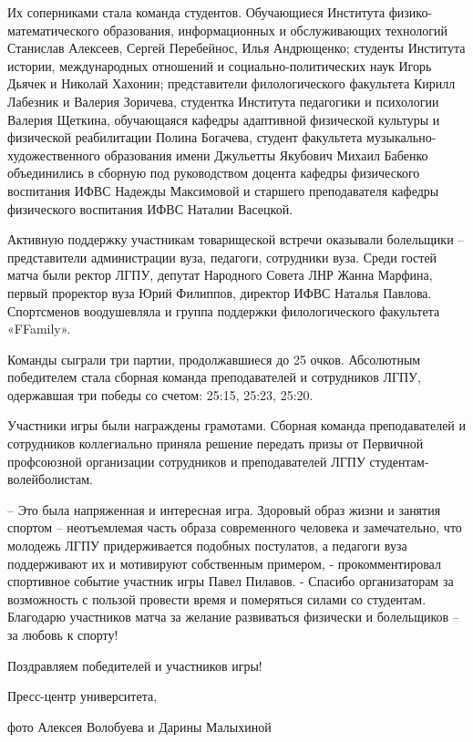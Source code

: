 
Их соперниками стала команда студентов. Обучающиеся Института
физико-математического образования, информационных и обслуживающих технологий
Станислав Алексеев, Сергей Перебейнос, Илья Андрющенко; студенты Института
истории, международных отношений и социально-политических наук Игорь Дьячек и
Николай Хахонин; представители филологического факультета Кирилл Лабезник и
Валерия Зоричева, студентка Института педагогики и психологии Валерия Щеткина,
обучающаяся кафедры адаптивной физической культуры и физической реабилитации
Полина Богачева, студент факультета музыкально-художественного образования
имени Джульетты Якубович Михаил Бабенко объединились в сборную под руководством
доцента кафедры физического воспитания ИФВС Надежды Максимовой и старшего
преподавателя кафедры физического воспитания ИФВС Наталии Васецкой.

Активную поддержку участникам товарищеской встречи оказывали болельщики –
представители администрации вуза, педагоги, сотрудники вуза. Среди гостей матча
были ректор ЛГПУ, депутат Народного Совета ЛНР Жанна Марфина, первый проректор
вуза Юрий Филиппов, директор ИФВС Наталья Павлова. Спортсменов воодушевляла и
группа поддержки филологического факультета «FFamily».

Команды сыграли три партии, продолжавшиеся до 25 очков. Абсолютным победителем
стала сборная команда преподавателей и сотрудников ЛГПУ, одержавшая три победы
со счетом: 25:15, 25:23, 25:20.

Участники игры были награждены грамотами. Сборная команда преподавателей и
сотрудников коллегиально приняла решение передать призы от Первичной
профсоюзной организации сотрудников и преподавателей ЛГПУ
студентам-волейболистам.

\begin{zznagolos}
\normalsize
– Это была напряженная и интересная игра. Здоровый образ жизни и занятия
спортом – неотъемлемая часть образа современного человека и замечательно, что
молодежь ЛГПУ придерживается подобных постулатов, а педагоги вуза поддерживают
их и мотивируют собственным примером, - прокомментировал спортивное событие
участник игры Павел Пилавов. - Спасибо организаторам за возможность с пользой
провести время  и померяться силами со студентам. Благодарю участников матча за
желание развиваться физически и болельщиков – за любовь к спорту!
\end{zznagolos}

Поздравляем победителей и участников игры!

Пресс-центр университета,

фото Алексея Волобуева и Дарины Малыхиной
